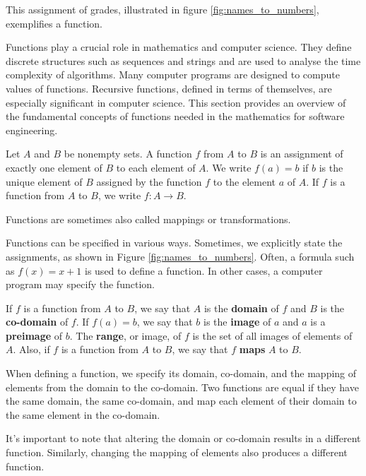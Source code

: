 This assignment of grades, illustrated in figure \ref{fig:names_to_numbers}, exemplifies a function.

Functions play a crucial role in mathematics and computer science. They define discrete structures such as sequences and strings and are used to analyse the time complexity of algorithms. Many computer programs are designed to compute values of functions. Recursive functions, defined in terms of themselves, are especially significant in computer science. This section provides an overview of the fundamental concepts of functions needed in the mathematics for software engineering.

\begin{definition}
Let $A$ and $B$ be nonempty sets. A function $f$ from $A$ to $B$ is an assignment of exactly one element of $B$ to each element of $A$. We write $f(a)=b$ if $b$ is the unique element of $B$ assigned by the function $f$ to the element $a$ of $A$. If $f$ is a function from $A$ to $B$, we write $f: A \rightarrow B$.
\end{definition}

\begin{remark}
    Functions are sometimes also called mappings or transformations.
\end{remark}

Functions can be specified in various ways. Sometimes, we explicitly state the assignments, as shown in Figure \ref{fig:names_to_numbers}. Often, a formula such as \(f(x) = x + 1\) is used to define a function. In other cases, a computer program may specify the function.

\begin{definition}
If $f$ is a function from $A$ to $B$, we say that $A$ is the \textbf{domain} of $f$ and $B$ is the \textbf{co-domain} of $f$. If $f(a)=b$, we say that $b$ is the \textbf{image} of $a$ and $a$ is a \textbf{preimage} of $b$. The \textbf{range}, or image, of $f$ is the set of all images of elements of $A$. Also, if $f$ is a function from $A$ to $B$, we say that $f$ \textbf{maps} $A$ to $B$.    
\end{definition}

When defining a function, we specify its domain, co-domain, and the mapping of elements from the domain to the co-domain. Two functions are equal if they have the same domain, the same co-domain, and map each element of their domain to the same element in the co-domain. 

It's important to note that altering the domain or co-domain results in a different function. Similarly, changing the mapping of elements also produces a different function.


